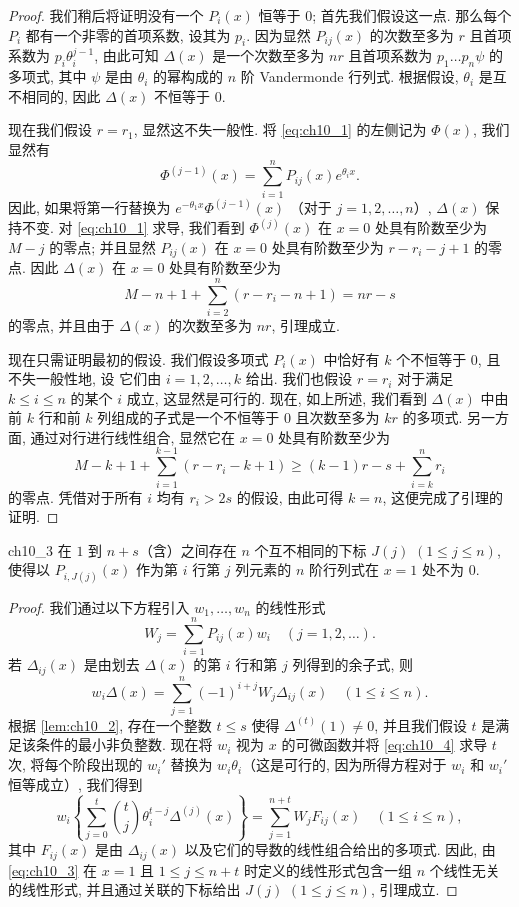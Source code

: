 \begin{proof}
我们稍后将证明没有一个 $P_i(x)$ 恒等于 0; 首先我们假设这一点. 那么每个 $P_i$ 都有一个非零的首项系数, 设其为 $p_i$. 因为显然 $P_{ij}(x)$ 的次数至多为 $r$ 且首项系数为 $p_i \theta_i^{j-1}$, 由此可知 $\Delta(x)$ 是一个次数至多为 $nr$ 且首项系数为 $p_1 \dots p_n \psi$ 的多项式, 其中 $\psi$ 是由 $\theta_i$ 的幂构成的 $n$ 阶 Vandermonde 行列式. 根据假设, $\theta_i$ 是互不相同的, 因此 $\Delta(x)$ 不恒等于 0.

现在我们假设 $r = r_1$, 显然这不失一般性. 将 \eqref{eq:ch10_1} 的左侧记为 $\Phi(x)$, 我们显然有
\[\Phi^{(j-1)}(x) = \sum_{i=1}^{n} P_{ij}(x) e^{\theta_i x}.\]
因此, 如果将第一行替换为 $e^{-\theta_1 x} \Phi^{(j-1)}(x)$ （对于 $j=1,2,\ldots,n$）, $\Delta(x)$ 保持不变. 对 \eqref{eq:ch10_1} 求导, 我们看到 $\Phi^{(j)}(x)$ 在 $x=0$ 处具有阶数至少为 $M-j$ 的零点; 并且显然 $P_{ij}(x)$ 在 $x=0$ 处具有阶数至少为 $r-r_i-j+1$ 的零点. 因此 $\Delta(x)$ 在 $x=0$ 处具有阶数至少为
\[M-n+1+\sum_{i=2}^{n}(r-r_{i}-n+1)=nr-s\]
的零点, 并且由于 $\Delta(x)$ 的次数至多为 $nr$, 引理成立.

现在只需证明最初的假设. 我们假设多项式 $P_i(x)$ 中恰好有 $k$ 个不恒等于 0, 且不失一般性地, 设 它们由 $i=1,2,\dots,k$ 给出. 我们也假设 $r=r_i$ 对于满足 $k \le i \le n$ 的某个 $i$ 成立, 这显然是可行的. 现在, 如上所述, 我们看到 $\Delta(x)$ 中由前 $k$ 行和前 $k$ 列组成的子式是一个不恒等于 0 且次数至多为 $kr$ 的多项式. 另一方面, 通过对行进行线性组合, 显然它在 $x=0$ 处具有阶数至少为
\[M-k+1+\sum_{i=1}^{k-1}(r-r_i-k+1) \ge (k-1)r-s+\sum_{i=k}^n r_i\]
的零点. 凭借对于所有 $i$ 均有 $r_i > 2s$ 的假设, 由此可得 $k = n$, 这便完成了引理的证明.
\end{proof}

\begin{mylemma}{}{ch10_3}
在 $1$ 到 $n+s$（含）之间存在 $n$ 个互不相同的下标 $J(j)$ $(1 \le j \le n)$, 使得以 $P_{i,J(j)}(x)$ 作为第 $i$ 行第 $j$ 列元素的 $n$ 阶行列式在 $x=1$ 处不为 0.
\end{mylemma}

\begin{proof}
我们通过以下方程引入 $w_1, \ldots, w_n$ 的线性形式
\[W_{j} = \sum_{i=1}^{n} P_{ij}(x) w_{i} \quad (j = 1, 2, \ldots). \tag{3}\label{eq:ch10_3}\]
若 $\Delta_{ij}(x)$ 是由划去 $\Delta(x)$ 的第 $i$ 行和第 $j$ 列得到的余子式, 则
\[w_{i}\Delta(x) = \sum_{j=1}^{n} (-1)^{i+j} W_{j}\Delta_{ij}(x) \quad (1 \leq i \leq n). \tag{4}\label{eq:ch10_4}\]
根据 \autoref{lem:ch10_2}, 存在一个整数 $t \leq s$ 使得 $\Delta^{(t)}(1) \neq 0$, 并且我们假设 $t$ 是满足该条件的最小非负整数. 现在将 $w_i$ 视为 $x$ 的可微函数并将 \eqref{eq:ch10_4} 求导 $t$ 次, 将每个阶段出现的 $w_i'$ 替换为 $w_i\theta_i$（这是可行的, 因为所得方程对于 $w_i$ 和 $w_i'$ 恒等成立）, 我们得到
\[w_i \left\{ \sum_{j=0}^t \binom{t}{j} \theta_i^{t-j} \Delta^{(j)}(x) \right\} = \sum_{j=1}^{n+t} W_j F_{ij}(x) \quad (1 \leq i \leq n),\]
其中 $F_{ij}(x)$ 是由 $\Delta_{ij}(x)$ 以及它们的导数的线性组合给出的多项式. 因此, 由 \eqref{eq:ch10_3} 在 $x = 1$ 且 $1 \le j \le n + t$ 时定义的线性形式包含一组 $n$ 个线性无关的线性形式, 并且通过关联的下标给出 $J(j)$ $(1 \le j \le n)$, 引理成立.
\end{proof}

